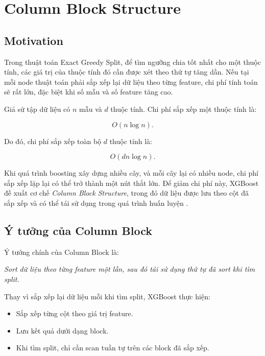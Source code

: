 \section{Column Block Structure}

\subsection{Motivation}

Trong thuật toán Exact Greedy Split, để tìm ngưỡng chia tốt nhất cho một thuộc tính, các giá trị của thuộc tính đó cần được xét theo thứ tự tăng dần. Nếu tại mỗi node thuật toán phải sắp xếp lại dữ liệu theo từng feature, chi phí tính toán sẽ rất lớn, đặc biệt khi số mẫu và số feature tăng cao.

Giả sử tập dữ liệu có $n$ mẫu và $d$ thuộc tính. Chi phí sắp xếp một thuộc tính là:

\[
O(n\log n).
\]

Do đó, chi phí sắp xếp toàn bộ $d$ thuộc tính là:

\[
O(dn\log n).
\]

Khi quá trình boosting xây dựng nhiều cây, và mỗi cây lại có nhiều node, chi phí sắp xếp lặp lại có thể trở thành một nút thắt lớn. Để giảm chi phí này, XGBoost đề xuất cơ chế \textit{Column Block Structure}, trong đó dữ liệu được lưu theo cột đã sắp xếp và có thể tái sử dụng trong quá trình huấn luyện \cite{chen2016xgboost}.

\subsection{Ý tưởng của Column Block}

Ý tưởng chính của Column Block là:

\begin{center}
\textit{Sort dữ liệu theo từng feature một lần, sau đó tái sử dụng thứ tự đã sort khi tìm split.}
\end{center}

Thay vì sắp xếp lại dữ liệu mỗi khi tìm split, XGBoost thực hiện:

\begin{itemize}
    \item Sắp xếp từng cột theo giá trị feature.
    \item Lưu kết quả dưới dạng block.
    \item Khi tìm split, chỉ cần scan tuần tự trên các block đã sắp xếp.
\end{itemize}


